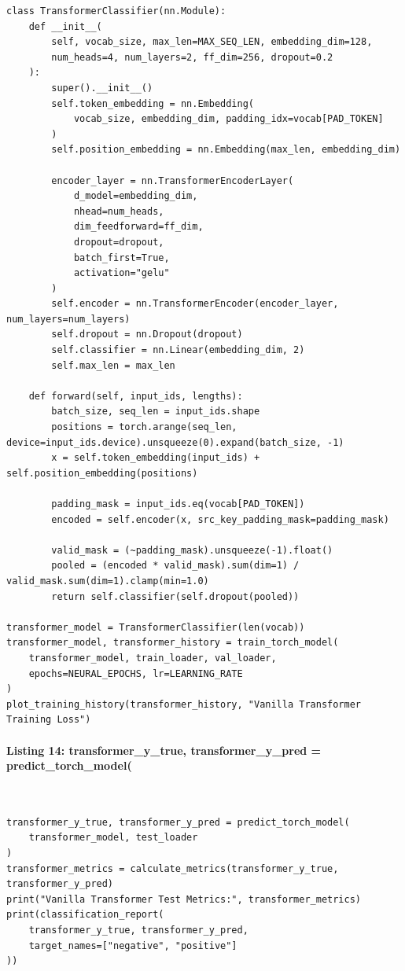 \documentclass[12pt,a4paper,oneside]{report}
\begin{document}
\begin{Verbatim}[commandchars=\\\{\},breaklines=true,breakanywhere=true,fontsize=\scriptsize,frame=leftline,framesep=2mm,rulecolor=\color{gray}]
class TransformerClassifier(nn.Module):
    def __init__(
        self, vocab_size, max_len=MAX_SEQ_LEN, embedding_dim=128,
        num_heads=4, num_layers=2, ff_dim=256, dropout=0.2
    ):
        super().__init__()
        self.token_embedding = nn.Embedding(
            vocab_size, embedding_dim, padding_idx=vocab[PAD_TOKEN]
        )
        self.position_embedding = nn.Embedding(max_len, embedding_dim)

        encoder_layer = nn.TransformerEncoderLayer(
            d_model=embedding_dim,
            nhead=num_heads,
            dim_feedforward=ff_dim,
            dropout=dropout,
            batch_first=True,
            activation="gelu"
        )
        self.encoder = nn.TransformerEncoder(encoder_layer, num_layers=num_layers)
        self.dropout = nn.Dropout(dropout)
        self.classifier = nn.Linear(embedding_dim, 2)
        self.max_len = max_len

    def forward(self, input_ids, lengths):
        batch_size, seq_len = input_ids.shape
        positions = torch.arange(seq_len, device=input_ids.device).unsqueeze(0).expand(batch_size, -1)
        x = self.token_embedding(input_ids) + self.position_embedding(positions)

        padding_mask = input_ids.eq(vocab[PAD_TOKEN])
        encoded = self.encoder(x, src_key_padding_mask=padding_mask)

        valid_mask = (~padding_mask).unsqueeze(-1).float()
        pooled = (encoded * valid_mask).sum(dim=1) / valid_mask.sum(dim=1).clamp(min=1.0)
        return self.classifier(self.dropout(pooled))

transformer_model = TransformerClassifier(len(vocab))
transformer_model, transformer_history = train_torch_model(
    transformer_model, train_loader, val_loader,
    epochs=NEURAL_EPOCHS, lr=LEARNING_RATE
)
plot_training_history(transformer_history, "Vanilla Transformer Training Loss")
\end{Verbatim}
\paragraph{Listing 14: transformer\_y\_true, transformer\_y\_pred = predict\_torch\_model(}\mbox{}\\[-1ex]
\begin{Verbatim}[commandchars=\\\{\},breaklines=true,breakanywhere=true,fontsize=\scriptsize,frame=leftline,framesep=2mm,rulecolor=\color{gray}]
transformer_y_true, transformer_y_pred = predict_torch_model(
    transformer_model, test_loader
)
transformer_metrics = calculate_metrics(transformer_y_true, transformer_y_pred)
print("Vanilla Transformer Test Metrics:", transformer_metrics)
print(classification_report(
    transformer_y_true, transformer_y_pred,
    target_names=["negative", "positive"]
))
\end{Verbatim}
\end{document}
